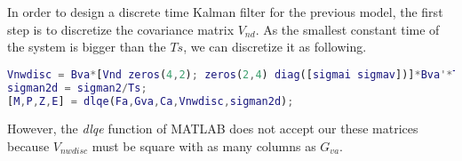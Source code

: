 In order to design a discrete time Kalman filter for the previous model, the first step is to discretize the covariance matrix $V_{nd}$. As the smallest constant time of the system is bigger than the $Ts$, we can discretize it as following.

\begin{lstlisting}[language=Matlab]
Vnwdisc = Bva*[Vnd zeros(4,2); zeros(2,4) diag([sigmai sigmav])]*Bva'*Ts;
sigman2d = sigman2/Ts;
[M,P,Z,E] = dlqe(Fa,Gva,Ca,Vnwdisc,sigman2d);
\end{lstlisting}

However, the \emph{dlqe} function of MATLAB does not accept our these matrices because $V_{nwdisc}$ must be square with as many columns as $G_{va}$.